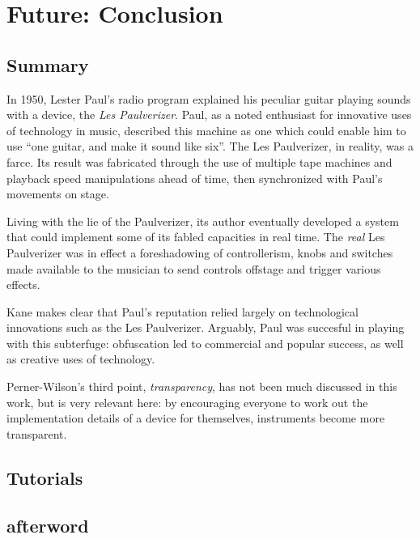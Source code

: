 \chapter{Future: Conclusion}\label{conclusion}
 
\section{Summary}

In 1950, Lester Paul's radio program explained his peculiar guitar playing sounds with a device, the \emph{Les Paulverizer}. Paul, as a noted enthusiast for innovative uses of technology in music, described this machine as one which could enable him to use ``one guitar, and make it sound like six''. The Les Paulverizer, in reality, was a farce. Its result was fabricated through the use of multiple tape machines and playback speed manipulations ahead of time, then synchronized with Paul's movements on stage. 

Living with the lie of the Paulverizer, its author eventually developed a system that could implement some of its fabled capacities in real time. The \emph{real} Les Paulverizer was in effect a foreshadowing of controllerism, knobs and switches made available to the musician to send controls offstage and trigger various effects\citep{kane2014}. 

Kane makes clear that Paul's reputation relied largely on technological innovations such as the Les Paulverizer. Arguably, Paul was succesful in playing with this subterfuge: obfuscation led to commercial and popular success, as well as creative uses of technology. 

Perner-Wilson's third point, \emph{transparency}, has not been much discussed in this work, but is very relevant here: by encouraging everyone to work out the implementation details of a device for themselves, instruments become more transparent.  

\section{Tutorials}


\section{afterword}


